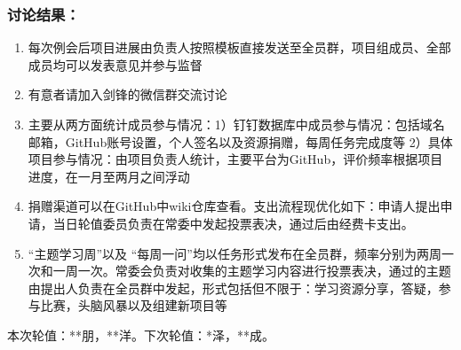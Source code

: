 \documentclass[]{article}
\providecommand{\tightlist}{%
  \setlength{\itemsep}{0pt}\setlength{\parskip}{0pt}}
\begin{document}
\subsubsection{讨论结果：}

\begin{enumerate}
\def\labelenumi{\arabic{enumi}.}
\tightlist
\item
  每次例会后项目进展由负责人按照模板直接发送至全员群，项目组成员、全部成员均可以发表意见并参与监督
\item
  有意者请加入剑锋的微信群交流讨论
\item
  主要从两方面统计成员参与情况：1）钉钉数据库中成员参与情况：包括域名邮箱，GitHub账号设置，个人签名以及资源捐赠，每周任务完成度等
  2）具体项目参与情况：由项目负责人统计，主要平台为GitHub，评价频率根据项目进度，在一月至两月之间浮动
\item
  捐赠渠道可以在GitHub中wiki仓库查看。支出流程现优化如下：申请人提出申请，当日轮值委员负责在常委中发起投票表决，通过后由经费卡支出。
\item
  ``主题学习周''以及
  ``每周一问''均以任务形式发布在全员群，频率分别为两周一次和一周一次。常委会负责对收集的主题学习内容进行投票表决，通过的主题由提出人负责在全员群中发起，形式包括但不限于：学习资源分享，答疑，参与比赛，头脑风暴以及组建新项目等
\end{enumerate}

本次轮值：**朋，**洋。下次轮值：*泽，**成。
\end{document}
